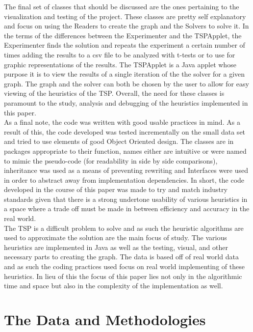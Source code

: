 \documentclass[midd]{thesis}
\newcommand{\tab}{\hspace*{2em}}
\begin{document}
\tab The final set of classes that should be discussed are the ones pertaining to the visualization and testing of the project. These classes are pretty self explanatory and focus on using the Readers to create the graph and the Solvers to solve it. In the terms of the differences between the Experimenter and the TSPApplet, the Experimenter finds the solution and repeats the experiment a certain number of times adding the results to a csv file to be analyzed with t-tests or to use for graphic representations of the results. The TSPApplet is a Java applet whose purpose it is to view the results of a single iteration of the the solver for a given graph. The graph and the solver can both be chosen by the user to allow for easy viewing of the heuristics of the TSP. Overall, the need for these classes is paramount to the study, analysis and debugging of the heuristics implemented in this paper.\\
\tab As a final note, the code was written with good usable practices in mind. As a result of this, the code developed was tested incrementally on the small data set and tried to use elements of good Object Oriented design. The classes are in packages appropriate to their function, names either are intuitive or were named to mimic the pseudo-code (for readability in side by side comparisons), inheritance was used as a means of preventing rewriting and Interfaces were used in order to abstract away from implementation dependencies. In short, the code developed in the course of this paper was made to try and match industry standards given that there is a strong undertone usability of various heuristics in a space where a trade off must be made in between efficiency and accuracy in the real world.\\
\tab The TSP is a difficult problem to solve and as such the heuristic algorithms are used to approximate the solution are the main focus of study. The various heuristics are implemented in Java as well as the testing, visual, and other necessary parts to creating the graph. The data is based off of real world data and as such the coding practices used focus on real world implementing of these heuristics. In lieu of this the focus of this paper lies not only in the algorithmic time and space but also in the complexity of the implementation as well.

\chapter{The Data and Methodologies}
\end{document}
